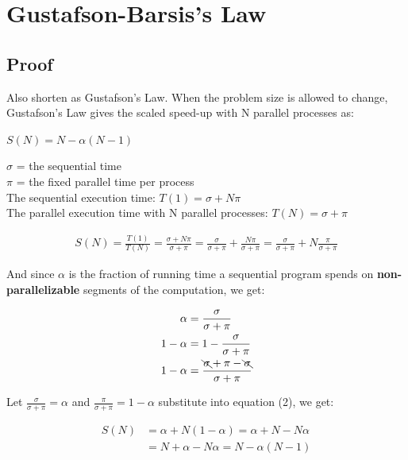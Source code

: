 \documentclass[a4paper]{article}
\begin{document}
\section{Gustafson-Barsis's Law}
\subsection{Proof}
Also shorten as Gustafson's Law. When the problem size is allowed to change, Gustafson's Law gives the scaled speed-up with N parallel processes as:
\begin{center}
$S(N) = N - \alpha(N - 1)$
\end{center}
\noindent
$\sigma$ = the sequential time \\
$\pi$ = the fixed parallel time per process \\
The sequential execution time: $T(1) = \sigma + N\pi$ \\
The parallel execution time with N parallel processes: $T(N) = \sigma + \pi$ 

\begin{large}
\begin{align}
S(N) = \frac{T(1)}{T(N)} = \frac{\sigma + N\pi}{\sigma + \pi} = \frac{\sigma}{\sigma + \pi} + \frac{N\pi}{\sigma + \pi} = \frac{\sigma}{\sigma + \pi} +  N \frac{\pi}{\sigma + \pi}
\end{align}
\end{large}

\noindent
And since $\alpha$ is the fraction of running time a sequential program spends on \textbf{non-parallelizable} segments of the computation, we get:
\begin{large}
\begin{align*}
\alpha &= \frac{\sigma}{\sigma + \pi} \\
1 - \alpha &= 1 - \frac{\sigma}{\sigma + \pi} \\
1 - \alpha &= \frac{\bcancel{\sigma} + \pi - \bcancel{\sigma}}{\sigma + \pi}
\end{align*}
\end{large}

Let {\large $\frac{\sigma}{\sigma + \pi} = \alpha$} and {\large $\frac{\pi}{\sigma + \pi} = 1 - \alpha$} substitute into equation (2), we get:

\begin{large}
\begin{align*}
S(N) &= \alpha + N (1 - \alpha) = \alpha + N - N\alpha  \\
&= N + \alpha - N\alpha = N - \alpha(N - 1)
\end{align*}
\end{large}
\end{document}
